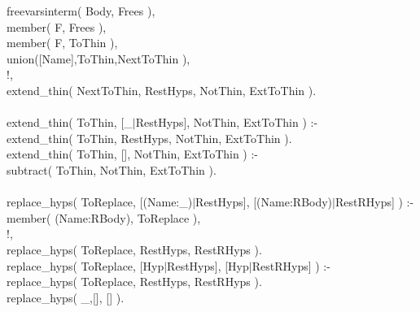 \documentclass[11pt]{report}
\begin{document}
\begin{sf}
\begin{tabbing}
\hspace{2em}freevarsinterm( Body, Frees ),\\[-0.15ex]
\hspace{2em}member( F, Frees ),\\[-0.15ex]
\hspace{2em}member( F, ToThin ),\\[-0.15ex]
\hspace{2em}union([Name],ToThin,NextToThin ),\\[-0.15ex]
\hspace{2em}!,\\[-0.15ex]
\hspace{2em}extend\_\hspace{0.1em}thin( NextToThin, RestHyps, NotThin, ExtToThin ).\\[-0.7ex]
\\[-0.15ex]
extend\_\hspace{0.1em}thin( ToThin, [\_\hspace{0.1em}$\mid$RestHyps], NotThin, ExtToThin ) :-\\[-0.15ex]
\hspace{2em}extend\_\hspace{0.1em}thin( ToThin, RestHyps, NotThin, ExtToThin ).\\[-0.15ex]
extend\_\hspace{0.1em}thin(  ToThin, [], NotThin, ExtToThin ) :-\\[-0.15ex]
\hspace{2em}subtract( ToThin, NotThin, ExtToThin ).\\[-0.7ex]
\\[-0.15ex]
replace\_\hspace{0.1em}hyps( ToReplace, [(Name:\_\hspace{0.1em})$\mid$RestHyps], [(Name:RBody)$\mid$RestRHyps] ) :-\\[-0.15ex]
\hspace{2em}member( (Name:RBody), ToReplace ),\\[-0.15ex]
\hspace{2em}!,\\[-0.15ex]
\hspace{2em}replace\_\hspace{0.1em}hyps( ToReplace, RestHyps, RestRHyps ).\\[-0.15ex]
replace\_\hspace{0.1em}hyps( ToReplace, [Hyp$\mid$RestHyps], [Hyp$\mid$RestRHyps] ) :-\\[-0.15ex]
\hspace{2em}replace\_\hspace{0.1em}hyps( ToReplace, RestHyps, RestRHyps ).\\[-0.15ex]
replace\_\hspace{0.1em}hyps( \_\hspace{0.1em},[], [] ).
\end{tabbing}\end{sf}
\end{document}
